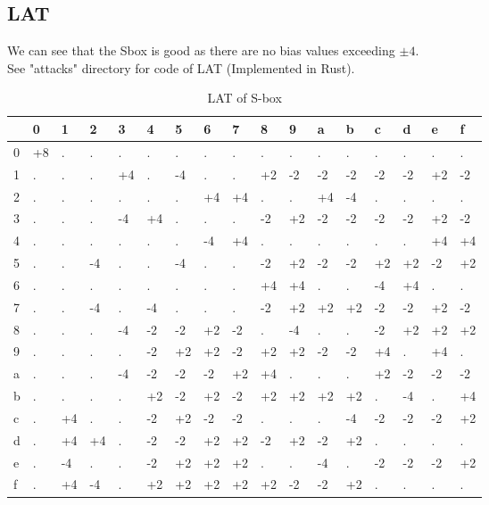 \documentclass[final]{transcrypto}
\begin{document}
\subsection{LAT}
We can see that the Sbox is good as there are no bias values exceeding $\pm 4$.\\
See "attacks" directory for code of LAT (Implemented in Rust).
\begin{table}[H]
	\centering
	\caption{LAT of S-box}
	\begin{tabular}{|l||l|l|l|l|l|l|l|l|l|l|l|l|l|l|l|l|}
		\hline
&0&1&2&3&4&5&6&7&8&9&a&b&c&d&e&f\\ \hline
\hline
0&+8&.&.&.&.&.&.&.&.&.&.&.&.&.&.&.\\ \hline
1&.&.&.&+4&.&-4&.&.&+2&-2&-2&-2&-2&-2&+2&-2\\ \hline
2&.&.&.&.&.&.&+4&+4&.&.&+4&-4&.&.&.&.\\ \hline
3&.&.&.&-4&+4&.&.&.&-2&+2&-2&-2&-2&-2&+2&-2\\ \hline
4&.&.&.&.&.&.&-4&+4&.&.&.&.&.&.&+4&+4\\ \hline
5&.&.&-4&.&.&-4&.&.&-2&+2&-2&-2&+2&+2&-2&+2\\ \hline
6&.&.&.&.&.&.&.&.&+4&+4&.&.&-4&+4&.&.\\ \hline
7&.&.&-4&.&-4&.&.&.&-2&+2&+2&+2&-2&-2&+2&-2\\ \hline
8&.&.&.&-4&-2&-2&+2&-2&.&-4&.&.&-2&+2&+2&+2\\ \hline
9&.&.&.&.&-2&+2&+2&-2&+2&+2&-2&-2&+4&.&+4&.\\ \hline
a&.&.&.&-4&-2&-2&-2&+2&+4&.&.&.&+2&-2&-2&-2\\ \hline
b&.&.&.&.&+2&-2&+2&-2&+2&+2&+2&+2&.&-4&.&+4\\ \hline
c&.&+4&.&.&-2&+2&-2&-2&.&.&.&-4&-2&-2&-2&+2\\ \hline
d&.&+4&+4&.&-2&-2&+2&+2&-2&+2&-2&+2&.&.&.&.\\ \hline
e&.&-4&.&.&-2&+2&+2&+2&.&.&-4&.&-2&-2&-2&+2\\ \hline
f&.&+4&-4&.&+2&+2&+2&+2&+2&-2&-2&+2&.&.&.&.\\ \hline
	\end{tabular}
\end{table}
\end{document}
